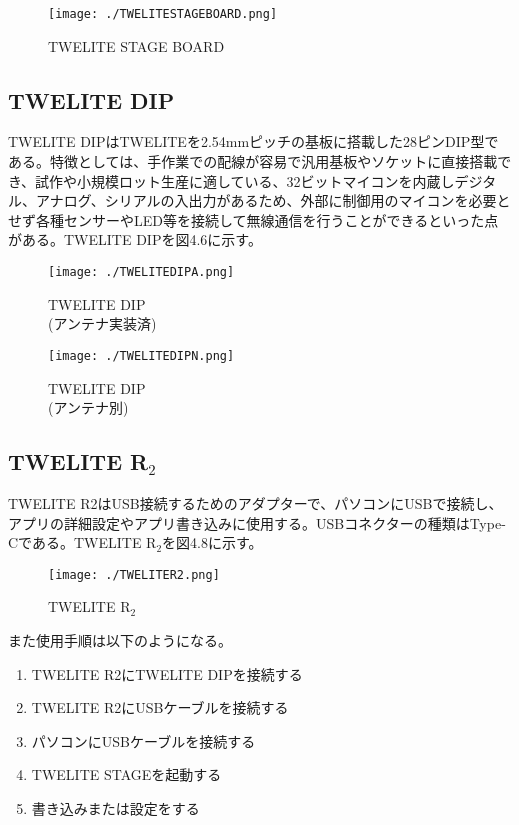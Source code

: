 \documentclass{thesis}
\begin{document}
\begin{figure}[H]
 \center
 \texttt{[image: ./TWELITESTAGEBOARD.png]}
 \caption{TWELITE STAGE BOARD}
\end{figure}

\subsection{TWELITE DIP}
TWELITE DIPはTWELITEを2.54mmピッチの基板に搭載した28ピンDIP型である。特徴としては、手作業での配線が容易で汎用基板やソケットに直接搭載でき、試作や小規模ロット生産に適している、32ビットマイコンを内蔵しデジタル、アナログ、シリアルの入出力があるため、外部に制御用のマイコンを必要とせず各種センサーやLED等を接続して無線通信を行うことができるといった点がある。TWELITE DIPを図4.6に示す。

\begin{figure}[htbp]
  \begin{minipage}[b]{0.45\linewidth}
    \centering
    \texttt{[image: ./TWELITEDIPA.png]}
    \caption{TWELITE DIP\\ (アンテナ実装済)}
  \end{minipage}
  \begin{minipage}[b]{0.45\linewidth}
    \centering
    \texttt{[image: ./TWELITEDIPN.png]}
    \caption{TWELITE DIP\\ (アンテナ別)}
  \end{minipage}
\end{figure}

\subsection{TWELITE R$_2$}
TWELITE R2はUSB接続するためのアダプターで、パソコンにUSBで接続し、アプリの詳細設定やアプリ書き込みに使用する。USBコネクターの種類はType-Cである。TWELITE R$_2$を図4.8に示す。

\begin{figure}[H]
 \center
 \texttt{[image: ./TWELITER2.png]}
 \caption{TWELITE R$_2$}
\end{figure}

また使用手順は以下のようになる。
\begin{enumerate}
  \item TWELITE R2にTWELITE DIPを接続する
  \item TWELITE R2にUSBケーブルを接続する
  \item パソコンにUSBケーブルを接続する
  \item TWELITE STAGEを起動する
  \item 書き込みまたは設定をする
\end{enumerate}
\end{document}
